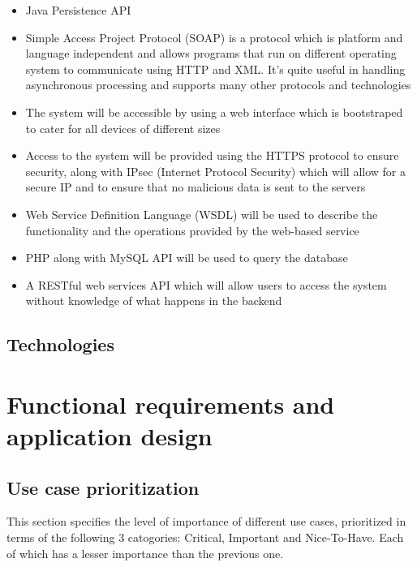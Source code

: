 \documentclass[11pt]{article}
\begin{document}
	\begin{itemize}
		\item Java Persistence API
		\item Simple Access Project Protocol (SOAP) is a protocol which is platform and language independent and allows programs that run on different operating system to communicate using HTTP and XML. It's quite useful in handling asynchronous processing and supports many other protocols and technologies
		\item The system will be accessible by using a web interface which is bootstraped to cater for all devices of different sizes
		\item Access to the system will be provided using the HTTPS protocol to ensure security, along with IPsec (Internet Protocol Security) which will allow for a secure IP and to ensure that no malicious data is sent to the servers
		\item Web Service Definition Language (WSDL) will be used to describe the functionality and the operations provided by the web-based service
		\item PHP along with MySQL API will be used to query the database
		\item A RESTful web services API which will allow users to access the system without knowledge of what happens in the backend
	\end{itemize}
	
	\subsection{Technologies}
	
	\newpage
	
	\section{Functional requirements and application design}
	
	\subsection{Use case prioritization}
	This section specifies the level of importance of different use cases, prioritized in terms of the following 3 catogories: Critical, Important and Nice-To-Have. Each of which has a lesser importance than the previous one.
	
\end{document}
